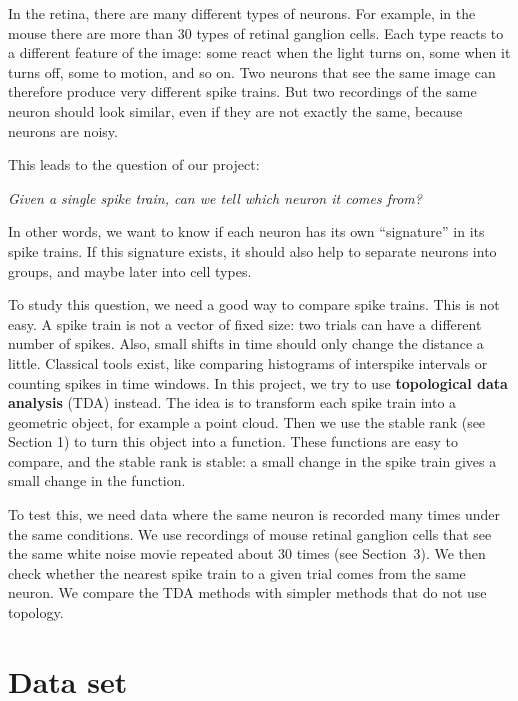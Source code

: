 \documentclass[11pt,a4paper]{article}
\begin{document}
In the retina, there are many different types of neurons. For example, in the mouse there are more than 30 types of retinal ganglion cells. Each type reacts to a different feature of the image: some react when the light turns on, some when it turns off, some to motion, and so on. Two neurons that see the same image can therefore produce very different spike trains. But two recordings of the same neuron should look similar, even if they are not exactly the same, because neurons are noisy.

This leads to the question of our project:
\begin{center}
    \textit{Given a single spike train, can we tell which neuron it comes from?}
\end{center}
In other words, we want to know if each neuron has its own ``signature'' in its spike trains. If this signature exists, it should also help to separate neurons into groups, and maybe later into cell types.

To study this question, we need a good way to compare spike trains. This is not easy. A spike train is not a vector of fixed size: two trials can have a different number of spikes. Also, small shifts in time should only change the distance a little. Classical tools exist, like comparing histograms of interspike intervals or counting spikes in time windows. In this project, we try to use \textbf{topological data analysis} (TDA) instead. The idea is to transform each spike train into a geometric object, for example a point cloud. Then we use the stable rank (see Section 1) to turn this object into a function. These functions are easy to compare, and the stable rank is stable: a small change in the spike train gives a small change in the function.

To test this, we need data where the same neuron is recorded many times under the same conditions. We use recordings of mouse retinal ganglion cells that see the same white noise movie repeated about 30 times (see Section~3). We then check whether the nearest spike train to a given trial comes from the same neuron. We compare the TDA methods with simpler methods that do not use topology.

\section{Data set}
\end{document}
